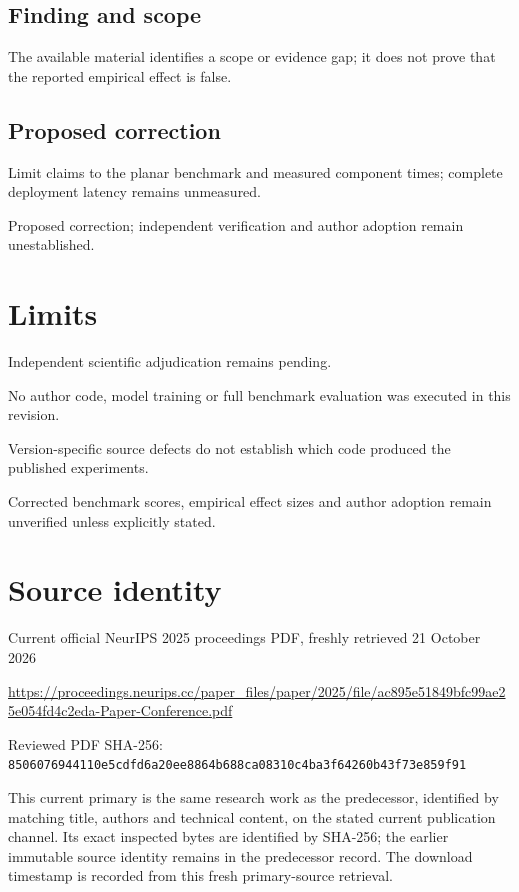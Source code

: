 \documentclass[11pt]{article}
\begin{document}
\subsection*{Finding and scope}

The available material identifies a scope or evidence gap; it does not prove that the reported empirical effect is false.

\subsection*{Proposed correction}

Limit claims to the planar benchmark and measured component times; complete deployment latency remains unmeasured.

Proposed correction; independent verification and author adoption remain unestablished.

\section*{Limits}

Independent scientific adjudication remains pending.\par

No author code, model training or full benchmark evaluation was executed in this revision.\par

Version-specific source defects do not establish which code produced the published experiments.\par

Corrected benchmark scores, empirical effect sizes and author adoption remain unverified unless explicitly stated.\par

\section*{Source identity}

Current official NeurIPS 2025 proceedings PDF, freshly retrieved 21 October 2026

\url{https://proceedings.neurips.cc/paper_files/paper/2025/file/ac895e51849bfc99ae25e054fd4c2eda-Paper-Conference.pdf}

Reviewed PDF SHA-256: \nolinkurl{8506076944110e5cdfd6a20ee8864b688ca08310c4ba3f64260b43f73e859f91}

This current primary is the same research work as the predecessor, identified by matching title, authors and technical content, on the stated current publication channel. Its exact inspected bytes are identified by SHA-256; the earlier immutable source identity remains in the predecessor record. The download timestamp is recorded from this fresh primary-source retrieval.
\end{document}
